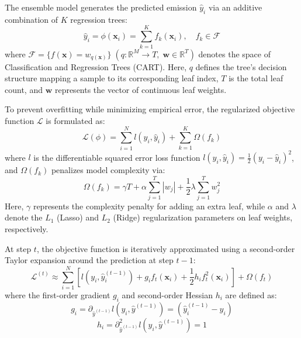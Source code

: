 \documentclass[conference]{IEEEtran}
\begin{document}
The ensemble model generates the predicted emission $\hat{y}_i$ via an additive combination of $K$ regression trees:
\begin{equation}
\hat{y}_i = \phi(\mathbf{x}_i) = \sum_{k=1}^K f_k(\mathbf{x}_i), \quad f_k \in \mathcal{F}
\label{eq:additive}
\end{equation}
where $\mathcal{F} = \{f(\mathbf{x}) = w_{q(\mathbf{x})}\} \; (q: \mathbb{R}^M \to T, \; \mathbf{w} \in \mathbb{R}^T)$ denotes the space of Classification and Regression Trees (CART). Here, $q$ defines the tree's decision structure mapping a sample to its corresponding leaf index, $T$ is the total leaf count, and $\mathbf{w}$ represents the vector of continuous leaf weights.

To prevent overfitting while minimizing empirical error, the regularized objective function $\mathcal{L}$ is formulated as:
\begin{equation}
\mathcal{L}(\phi) = \sum_{i=1}^N l(y_i, \hat{y}_i) + \sum_{k=1}^K \Omega(f_k)
\label{eq:objective}
\end{equation}
where $l$ is the differentiable squared error loss function $l(y_i, \hat{y}_i) = \frac{1}{2}(y_i - \hat{y}_i)^2$, and $\Omega(f_k)$ penalizes model complexity via:
\begin{equation}
\Omega(f_k) = \gamma T + \alpha \sum_{j=1}^T |w_j| + \frac{1}{2}\lambda \sum_{j=1}^T w_j^2
\label{eq:regularization}
\end{equation}
Here, $\gamma$ represents the complexity penalty for adding an extra leaf, while $\alpha$ and $\lambda$ denote the $L_1$ (Lasso) and $L_2$ (Ridge) regularization parameters on leaf weights, respectively.

At step $t$, the objective function is iteratively approximated using a second-order Taylor expansion around the prediction at step $t-1$:
\begin{equation}
\mathcal{L}^{(t)} \approx \sum_{i=1}^N \left[ l(y_i, \hat{y}_i^{(t-1)}) + g_i f_t(\mathbf{x}_i) + \frac{1}{2} h_i f_t^2(\mathbf{x}_i) \right] + \Omega(f_t)
\label{eq:taylor}
\end{equation}
where the first-order gradient $g_i$ and second-order Hessian $h_i$ are defined as:
\begin{equation}
g_i = \partial_{\hat{y}^{(t-1)}} l(y_i, \hat{y}^{(t-1)}) = (\hat{y}_i^{(t-1)} - y_i)
\end{equation}
\begin{equation}
h_i = \partial_{\hat{y}^{(t-1)}}^2 l(y_i, \hat{y}^{(t-1)}) = 1
\end{equation}
\end{document}
